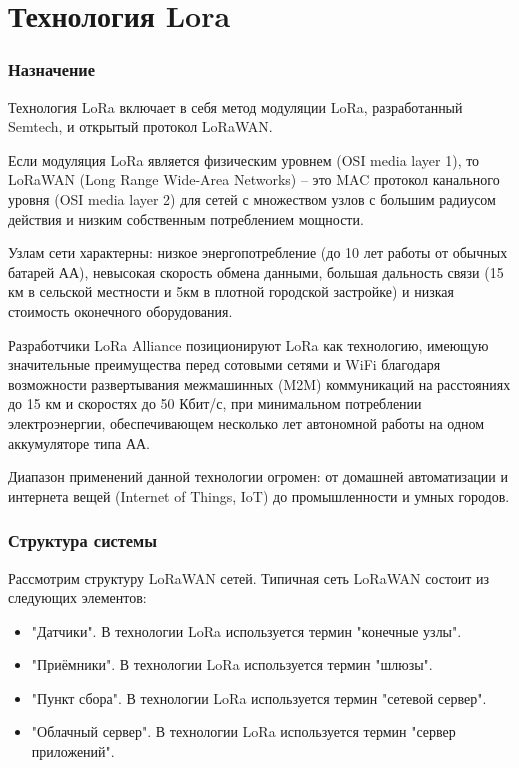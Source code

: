 \section{Технология Lora}
\subsubsection{Назначение}
Технология LoRa включает в себя метод модуляции LoRa, разработанный Semtech, и открытый протокол LoRaWAN.

Если модуляция LoRa является физическим уровнем (OSI media layer 1), то LoRaWAN (Long Range Wide-Area Networks) – это MAC протокол канального уровня (OSI media layer 2) для сетей с множеством узлов с большим радиусом действия и низким собственным потреблением мощности.   

Узлам сети характерны: низкое энергопотребление (до 10 лет работы от обычных батарей АА), невысокая скорость обмена данными, большая дальность связи (15 км в сельской местности и 5км в плотной городской застройке) и низкая стоимость оконечного оборудования.

Разработчики LoRa Alliance позиционируют LoRa как технологию, имеющую значительные преимущества перед сотовыми сетями и WiFi благодаря возможности развертывания межмашинных (M2M) коммуникаций на расстояниях до 15 км и скоростях до 50 Кбит/с, при минимальном потреблении электроэнергии, обеспечивающем несколько лет автономной работы на одном аккумуляторе типа АА.

Диапазон применений данной технологии огромен: от домашней автоматизации и интернета вещей (Internet of Things, IoT) до промышленности и умных городов.

\subsubsection{Структура системы}
Рассмотрим структуру LoRaWAN сетей. Типичная сеть LoRaWAN состоит из следующих элементов: 
\begin{itemize}
	\item"Датчики". В технологии LoRa используется термин "конечные узлы".
	\item"Приёмники". В технологии LoRa используется термин "шлюзы".
	\item"Пункт сбора". В технологии LoRa используется термин "сетевой сервер".
	\item"Облачный сервер". В технологии LoRa используется термин "сервер приложений".
\end{itemize}

